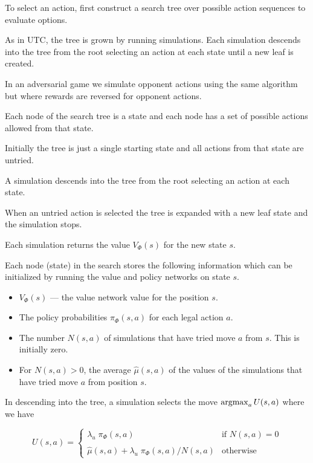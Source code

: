 {

To select an action, first construct a search tree over possible action sequences to evaluate options.

\vfill
As in UTC, the tree is grown by running simulations.  Each simulation descends into the tree from the root selecting an action at each state until a new leaf is created.

\vfill
In an adversarial game we simulate opponent actions using the same algorithm but where rewards are reversed for opponent actions.


Each node of the search tree is a state and each node has a set of possible actions allowed from that state.

\vfill
Initially the tree is just a single starting state and all actions from that state are untried.

\vfill
A simulation descends into the tree from the root selecting an action at each state.

\vfill
When an untried action is selected the tree is expanded with a new leaf state and the simulation stops.

\vfill
Each simulation returns the value $V_\Phi(s)$ for the new state $s$.


\vfill
Each node (state) in the search stores the following information which can be initialized
by running the value and policy networks on state $s$.

\begin{itemize}
\item $V_\Phi(s)$ --- the value network value for the position $s$.
\item The policy probabilities $\pi_\Phi(s,a)$ for each legal action $a$.
\item The number $N(s,a)$ of simulations that have tried move $a$ from $s$. This is initially zero.
\item For $N(s,a) > 0$, the average $\hat{\mu}(s,a)$ of the values of the simulations that have
  tried move $a$ from position $s$.
\end{itemize}


In descending into the tree, a simulation selects the move $\operatorname*{argmax}_a U(s,a)$ where we have

\vfill
$$U(s,a) =  \left\{\begin{array}{ll}\lambda_u \;\pi_\Phi(s,a) &\mbox{if $N(s,a) = 0$} \\  \\ \hat{\mu}(s,a) + \lambda_u\; \pi_\Phi(s,a)/N(s,a) & \mbox{otherwise} \end{array}\right.$$

}
